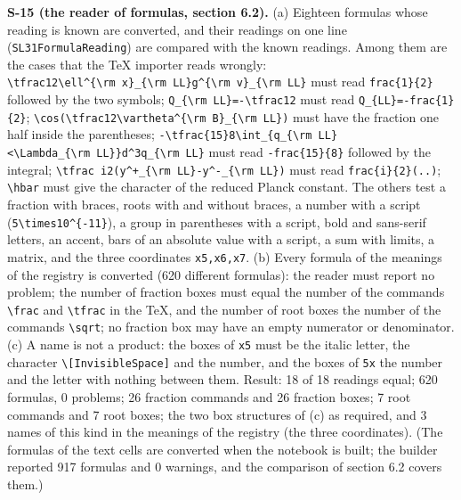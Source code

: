 \documentclass[
  10pt,
]{article}
\begin{document}
\textbf{S-15 (the reader of formulas, section 6.2).} (a) Eighteen
formulas whose reading is known are converted, and their readings on one
line (\texttt{SL31FormulaReading}) are compared with the known readings.
Among them are the cases that the TeX importer reads wrongly:
\texttt{\textbackslash{}tfrac12\textbackslash{}ell\^{}\{\textbackslash{}rm\ x\}\_\{\textbackslash{}rm\ LL\}g\^{}\{\textbackslash{}rm\ v\}\_\{\textbackslash{}rm\ LL\}}
must read \texttt{frac\{1\}\{2\}} followed by the two symbols;
\texttt{Q\_\{\textbackslash{}rm\ LL\}=-\textbackslash{}tfrac12} must
read \texttt{Q\_\{LL\}=-frac\{1\}\{2\}};
\texttt{\textbackslash{}cos(\textbackslash{}tfrac12\textbackslash{}vartheta\^{}\{\textbackslash{}rm\ B\}\_\{\textbackslash{}rm\ LL\})}
must have the fraction one half inside the parentheses;
\texttt{-\textbackslash{}tfrac\{15\}8\textbackslash{}int\_\{q\_\{\textbackslash{}rm\ LL\}\textless{}\textbackslash{}Lambda\_\{\textbackslash{}rm\ LL\}\}d\^{}3q\_\{\textbackslash{}rm\ LL\}}
must read \texttt{-frac\{15\}\{8\}} followed by the integral;
\texttt{\textbackslash{}tfrac\ i2(y\^{}+\_\{\textbackslash{}rm\ LL\}-y\^{}-\_\{\textbackslash{}rm\ LL\})}
must read \texttt{frac\{i\}\{2\}(..)}; \texttt{\textbackslash{}hbar}
must give the character of the reduced Planck constant. The others test
a fraction with braces, roots with and without braces, a number with a
script (\texttt{5\textbackslash{}times10\^{}\{-11\}}), a group in
parentheses with a script, bold and sans-serif letters, an accent, bars
of an absolute value with a script, a sum with limits, a matrix, and the
three coordinates \texttt{x5,x6,x7}. (b) Every formula of the meanings
of the registry is converted (620 different formulas): the reader must
report no problem; the number of fraction boxes must equal the number of
the commands \texttt{\textbackslash{}frac} and
\texttt{\textbackslash{}tfrac} in the TeX, and the number of root boxes
the number of the commands \texttt{\textbackslash{}sqrt}; no fraction
box may have an empty numerator or denominator. (c) A name is not a
product: the boxes of \texttt{x5} must be the italic letter, the
character \texttt{\textbackslash{}{[}InvisibleSpace{]}} and the number,
and the boxes of \texttt{5x} the number and the letter with nothing
between them. Result: 18 of 18 readings equal; 620 formulas, 0 problems;
26 fraction commands and 26 fraction boxes; 7 root commands and 7 root
boxes; the two box structures of (c) as required, and 3 names of this
kind in the meanings of the registry (the three coordinates). (The
formulas of the text cells are converted when the notebook is built; the
builder reported 917 formulas and 0 warnings, and the comparison of
section 6.2 covers them.)
\end{document}
